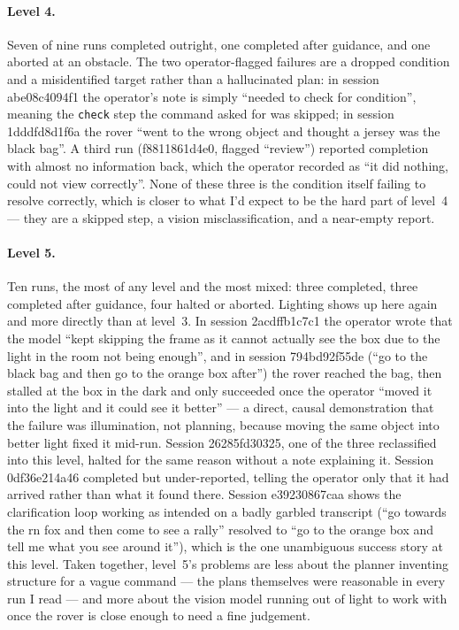 \paragraph{Level 4.} Seven of nine runs completed outright, one completed after guidance, and one aborted at an
obstacle. The two operator-flagged failures are a dropped condition and a misidentified target rather than a
hallucinated plan: in session abe08c4094f1 the operator's note is simply ``needed to check for condition'', meaning
the \texttt{check} step the command asked for was skipped; in session 1dddfd8d1f6a the rover ``went to the wrong
object and thought a jersey was the black bag''. A third run (f8811861d4e0, flagged ``review'') reported completion
with almost no information back, which the operator recorded as ``it did nothing, could not view correctly''. None
of these three is the condition itself failing to resolve correctly, which is closer to what I'd expect to be the
hard part of level~4 — they are a skipped step, a vision misclassification, and a near-empty report.

\paragraph{Level 5.} Ten runs, the most of any level and the most mixed: three completed, three completed after
guidance, four halted or aborted. Lighting shows up here again and more directly than at level~3. In session
2acdffb1c7c1 the operator wrote that the model ``kept skipping the frame as it cannot actually see the box due to
the light in the room not being enough'', and in session 794bd92f55de (``go to the black bag and then go to the
orange box after'') the rover reached the bag, then stalled at the box in the dark and only succeeded once the
operator ``moved it into the light and it could see it better'' — a direct, causal demonstration that the failure
was illumination, not planning, because moving the same object into better light fixed it mid-run. Session
26285fd30325, one of the three reclassified into this level, halted for the same reason without a note explaining
it. Session 0df36e214a46 completed but under-reported, telling the operator only that it had arrived rather than
what it found there. Session e39230867caa shows the clarification loop working as intended on a badly garbled
transcript (``go towards the rn fox and then come to see a rally'' resolved to ``go to the orange box and tell me
what you see around it''), which is the one unambiguous success story at this level. Taken together, level~5's
problems are less about the planner inventing structure for a vague command — the plans themselves were reasonable
in every run I read — and more about the vision model running out of light to work with once the rover is close
enough to need a fine judgement.

